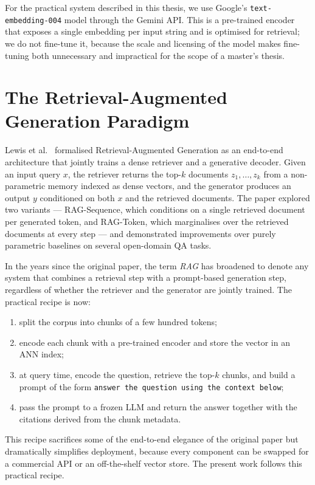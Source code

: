 For the practical system described in this thesis, we use Google's
\texttt{text-embedding-004} model through the Gemini API. This is a
pre-trained encoder that exposes a single embedding per input string and is
optimised for retrieval; we do not fine-tune it, because the scale and
licensing of the model makes fine-tuning both unnecessary and impractical
for the scope of a master's thesis.

\section{The Retrieval-Augmented Generation Paradigm}
\label{sec:rag}

Lewis et al.~\cite{Lewis2020RAG} formalised Retrieval-Augmented Generation
as an end-to-end architecture that jointly trains a dense retriever and a
generative decoder. Given an input query $x$, the retriever returns the
top-$k$ documents $z_1,\ldots,z_k$ from a non-parametric memory indexed as
dense vectors, and the generator produces an output $y$ conditioned on both
$x$ and the retrieved documents. The paper explored two variants ---
RAG-Sequence, which conditions on a single retrieved document per generated
token, and RAG-Token, which marginalises over the retrieved documents at
every step --- and demonstrated improvements over purely parametric
baselines on several open-domain QA tasks.

In the years since the original paper, the term \emph{RAG} has broadened to
denote any system that combines a retrieval step with a prompt-based
generation step, regardless of whether the retriever and the generator are
jointly trained. The practical recipe is now:

\begin{enumerate}
  \item split the corpus into chunks of a few hundred tokens;
  \item encode each chunk with a pre-trained encoder and store the vector
        in an ANN index;
  \item at query time, encode the question, retrieve the top-$k$ chunks,
        and build a prompt of the form
        \texttt{answer the question using the context below};
  \item pass the prompt to a frozen LLM and return the answer together with
        the citations derived from the chunk metadata.
\end{enumerate}

This recipe sacrifices some of the end-to-end elegance of the original paper
but dramatically simplifies deployment, because every component can be
swapped for a commercial API or an off-the-shelf vector store. The present
work follows this practical recipe.

